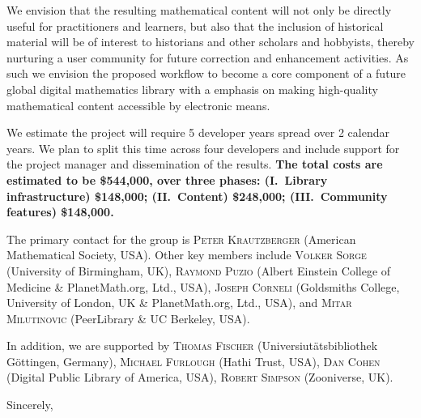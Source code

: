 \documentclass[10pt]{article}
\begin{document}
We envision that the resulting mathematical content will not only be
directly useful for practitioners and learners, but also that the
inclusion of historical material will be of interest to historians and
other scholars and hobbyists, thereby nurturing a user community for
future correction and enhancement activities.  As such we envision the
proposed workflow to become a core component of a future global
digital mathematics library with a emphasis on making high-quality
mathematical content accessible by electronic means.

We estimate the project will require 5 developer years spread over 2
calendar years. We plan to split this time across four developers and
include support for the project manager and dissemination of the
results.  \textbf{The total costs are estimated to be \$544,000, over
  three phases:
(I.~Library infrastructure) \$148,000;
(II.~Content)               \$248,000;
(III.~Community features)   \$148,000.}

The primary contact for the group is \textsc{Peter Krautzberger}
(American Mathematical Society, USA).  Other key members include
\textsc{Volker Sorge} (University of Birmingham, UK), \textsc{Raymond
  Puzio} (Albert Einstein College of Medicine \& PlanetMath.org, Ltd.,
USA), \textsc{Joseph Corneli} (Goldsmiths College, University of
London, UK \& PlanetMath.org, Ltd., USA), and \textsc{Mitar
  Milutinovic} (PeerLibrary \& UC Berkeley, USA).

In addition, we are supported by \textsc{Thomas Fischer} (Universiut{\"a}tsbibliothek
G{\"o}ttingen, Germany), \textsc{Michael Furlough} (Hathi Trust, USA), \textsc{Dan Cohen} (Digital Public Library of America, USA), \textsc{Robert Simpson} (Zooniverse, UK).
\begin{flushright}
Sincerely,\\
\quad \\
\quad \\
\quad 
\end{flushright}
\end{document}
